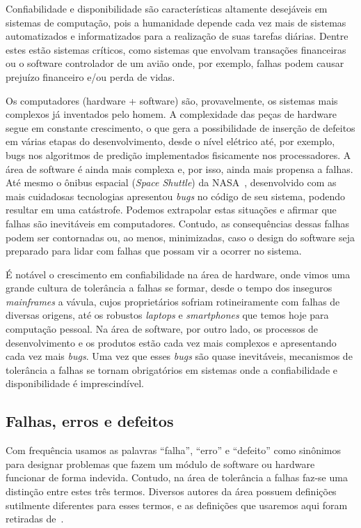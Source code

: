 Confiabilidade e disponibilidade são características altamente desejáveis em sistemas de computação, pois a humanidade depende cada vez mais de sistemas automatizados e informatizados para a realização de suas tarefas diárias. Dentre estes estão sistemas críticos, como sistemas que envolvam transações financeiras ou o software controlador de um avião onde, por exemplo, falhas podem causar prejuízo financeiro e/ou perda de vidas.

Os computadores (hardware + software) são, provavelmente, os sistemas mais complexos já inventados pelo homem. A complexidade das peças de hardware segue em constante crescimento, o que gera a possibilidade de inserção de defeitos em várias etapas do desenvolvimento, desde o nível elétrico até, por exemplo, bugs nos algoritmos de predição implementados fisicamente nos processadores. A área de software é ainda mais complexa e, por isso, ainda mais propensa a falhas. Até mesmo o ônibus espacial (\emph{Space Shuttle}) da NASA~\cite{BonacheaOnline}, desenvolvido com as mais cuidadosas tecnologias apresentou \emph{bugs} no código de seu sistema, podendo resultar em uma catástrofe. Podemos extrapolar estas situações e afirmar que falhas são inevitáveis em computadores. Contudo, as consequências dessas falhas podem ser contornadas ou, ao menos, minimizadas, caso o design do software seja preparado para lidar com falhas que possam vir a ocorrer no sistema.

É notável o crescimento em confiabilidade na área de hardware, onde vimos uma grande cultura de tolerância a falhas se formar, desde o tempo dos inseguros \emph{mainframes} a vávula, cujos proprietários sofriam rotineiramente com falhas de diversas origens, até os robustos \emph{laptops} e \emph{smartphones} que temos hoje para computação pessoal. Na área de software, por outro lado, os processos de desenvolvimento e os produtos estão cada vez mais complexos e apresentando cada vez mais \emph{bugs}. Uma vez que esses \emph{bugs} são quase inevitáveis, mecanismos de tolerância a falhas se tornam obrigatórios em sistemas onde a confiabilidade e disponibilidade é imprescindível.

\subsection{Falhas, erros e defeitos} %
\label{sub:falhas_erros_e_defeitos}

Com frequência usamos as palavras ``falha'', ``erro'' e ``defeito'' como sinônimos para designar problemas que fazem um módulo de software ou hardware funcionar de forma indevida. Contudo, na área de tolerância a falhas faz-se uma distinção entre estes três termos. Diversos autores da área possuem definições sutilmente diferentes para esses termos, e as definições que usaremos aqui foram retiradas de~\cite{koren2007fault}.

